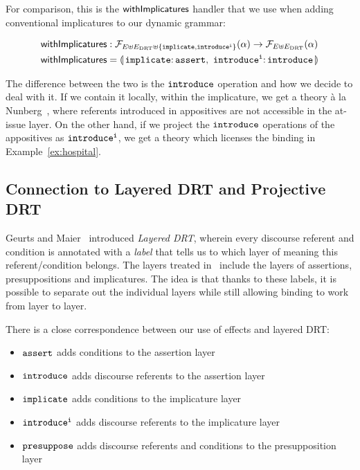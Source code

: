 For comparison, this is the $\textsf{withImplicatures}$ handler that we use when
adding conventional implicatures to our dynamic grammar:

\begin{align*}
  \withImplicatures &: \FF_{E \uplus E_\DRT \uplus \{\op{implicate},\op{introduce^i}\}}(\alpha)
                   \to \FF_{E \uplus E_\DRT}(\alpha) \\
  \withImplicatures &= \banana{\onto{\op{implicate}}{\op{assert}},\
                               \onto{\op{introduce^i}}{\op{introduce}}}
\end{align*}

The difference between the two is the $\mathtt{introduce}$ operation and how we
decide to deal with it. If we contain it locally, within the implicature,
we get a theory à la Nunberg~\cite{nunberg1990linguistics}, where referents
introduced in appositives are not accessible in the at-issue layer. On the
other hand, if we project the $\mathtt{introduce}$ operations of the
appositives as $\mathtt{introduce^i}$, we get a theory which licenses the
binding in Example~\ref{ex:hospital}.


\subsection{Connection to Layered DRT and Projective DRT}

Geurts and Maier~\cite{geurts2003layered} introduced \emph{Layered DRT},
wherein every discourse referent and condition is annotated with a
\emph{label} that tells us to which layer of meaning this
referent/condition belongs. The layers treated in~\cite{geurts2003layered}
include the layers of assertions, presuppositions and implicatures. The
idea is that thanks to these labels, it is possible to separate out the
individual layers while still allowing binding to work from layer to layer.

There is a close correspondence between our use of effects and layered
DRT:

\begin{itemize}
\item $\mathtt{assert}$ adds conditions to the assertion layer
\item $\mathtt{introduce}$ adds discourse referents to the assertion layer
\item $\mathtt{implicate}$ adds conditions to the implicature layer
\item $\mathtt{introduce^i}$ adds discourse referents to the implicature layer
\item $\mathtt{presuppose}$ adds discourse referents and conditions to the
  presupposition layer
\end{itemize}

